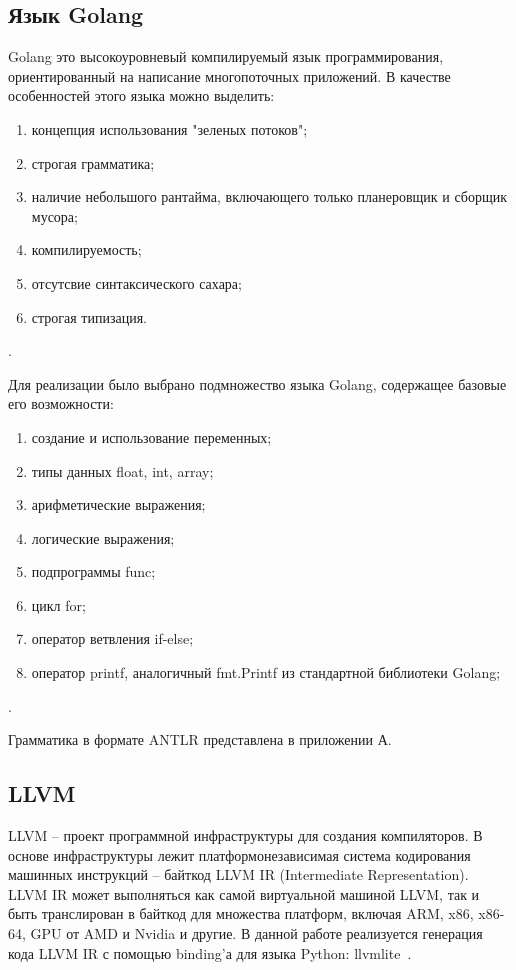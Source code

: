 \subsection{Язык Golang}\label{subsec:grammar}
Golang это высокоуровневый компилируемый язык программирования, ориентированный на написание многопоточных приложений.
В качестве особенностей этого языка можно выделить:
\begin{enumerate}
    \item концепция использования "зеленых потоков";
    \item строгая грамматика;
    \item наличие небольшого рантайма, включающего только планеровщик и сборщик мусора;
    \item компилируемость;
    \item отсутсвие синтаксического сахара;
    \item строгая типизация.
\end{enumerate}.

Для реализации было выбрано подмножество языка Golang, содержащее базовые его возможности:
\begin{enumerate}
    \item создание и использование переменных;
    \item типы данных float, int, array;
    \item арифметические выражения;
    \item логические выражения;
    \item подпрограммы func;
    \item цикл for;
    \item оператор ветвления if-else;
    \item оператор printf, аналогичный fmt.Printf из стандартной библиотеки Golang;
\end{enumerate}.

Грамматика в формате ANTLR представлена в приложении А.

\subsection{LLVM}\label{subsec:llvm}
LLVM – проект программной инфраструктуры для создания компиляторов.
В основе инфраструктуры лежит платформонезависимая система кодирования машинных инструкций – байткод LLVM IR (Intermediate
Representation).
LLVM IR может выполняться как самой виртуальной машиной LLVM, так и быть транслирован в байткод для множества платформ,
включая ARM, x86, x86-64, GPU от AMD и Nvidia и другие.
В данной работе реализуется генерация кода LLVM IR с помощью binding'а для языка Python: llvmlite~\cite{llvm}.
